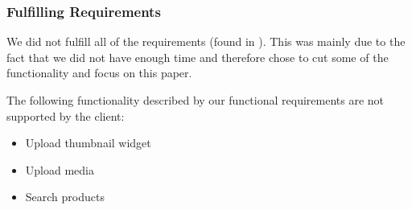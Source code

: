 \subsubsection{Fulfilling Requirements}
We did not fulfill all of the requirements (found in  ). This was mainly due to the fact that we did not have enough time and therefore chose to cut some of the functionality and focus on this paper.

The following functionality described by our functional requirements are not supported by the client:
\begin{itemize}
	\item Upload thumbnail widget
	\item Upload media
	\item Search products
\end{itemize}